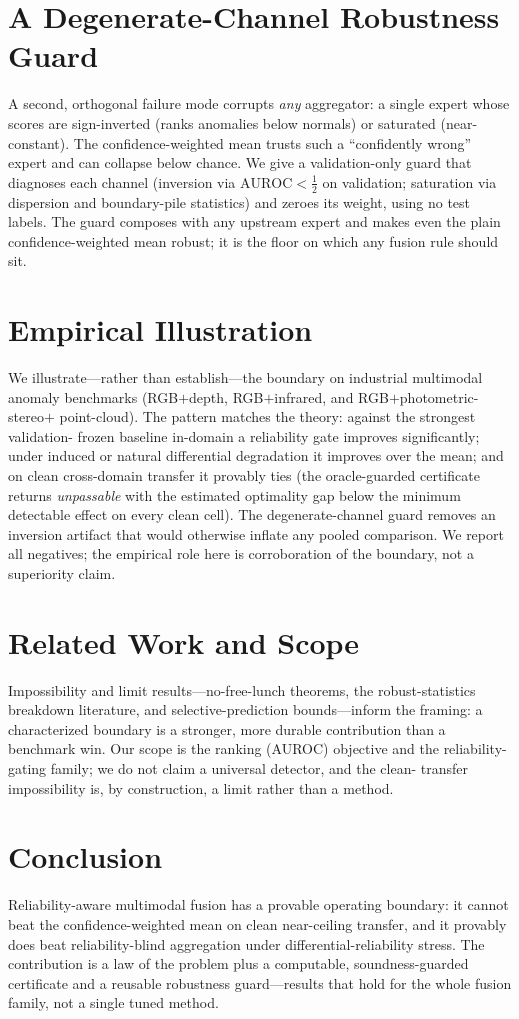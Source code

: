 \documentclass[11pt]{article}
\begin{document}
\section{A Degenerate-Channel Robustness Guard}\label{sec:guard}
A second, orthogonal failure mode corrupts \emph{any} aggregator: a single expert
whose scores are sign-inverted (ranks anomalies below normals) or saturated
(near-constant). The confidence-weighted mean trusts such a ``confidently wrong''
expert and can collapse below chance. We give a validation-only guard that
diagnoses each channel (inversion via $\mathrm{AUROC}<\tfrac12$ on validation;
saturation via dispersion and boundary-pile statistics) and zeroes its weight,
using no test labels. The guard composes with any upstream expert and makes even
the plain confidence-weighted mean robust; it is the floor on which any fusion rule
should sit.

\section{Empirical Illustration}
We illustrate---rather than establish---the boundary on industrial multimodal
anomaly benchmarks (RGB$+$depth, RGB$+$infrared, and RGB$+$photometric-stereo$+$
point-cloud). The pattern matches the theory: against the strongest validation-
frozen baseline in-domain a reliability gate improves significantly; under induced
or natural differential degradation it improves over the mean; and on clean
cross-domain transfer it provably ties (the oracle-guarded certificate returns
\emph{unpassable} with the estimated optimality gap below the minimum detectable
effect on every clean cell). The degenerate-channel guard removes an inversion
artifact that would otherwise inflate any pooled comparison. We report all
negatives; the empirical role here is corroboration of the boundary, not a
superiority claim.

\section{Related Work and Scope}
Impossibility and limit results---no-free-lunch theorems, the
robust-statistics breakdown literature, and selective-prediction bounds---inform
the framing: a characterized boundary is a stronger, more durable contribution
than a benchmark win. Our scope is the ranking (AUROC) objective and the
reliability-gating family; we do not claim a universal detector, and the clean-
transfer impossibility is, by construction, a limit rather than a method.

\section{Conclusion}
Reliability-aware multimodal fusion has a provable operating boundary: it cannot
beat the confidence-weighted mean on clean near-ceiling transfer, and it provably
does beat reliability-blind aggregation under differential-reliability stress. The
contribution is a law of the problem plus a computable, soundness-guarded
certificate and a reusable robustness guard---results that hold for the whole
fusion family, not a single tuned method.
\end{document}

